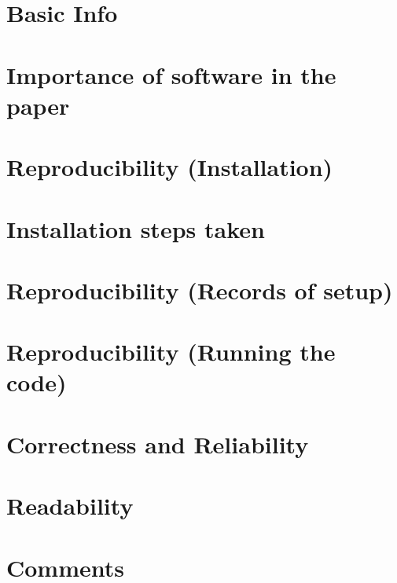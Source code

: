 \documentclass[10pt]{article}
\begin{document}
\section{Basic Info}


\section{Importance of software in the paper}


\section{Reproducibility (Installation)}


\section{Installation steps taken}


\section{Reproducibility (Records of setup)}


\section{Reproducibility (Running the code)}


\section{Correctness and Reliability}


\section{Readability}

 
\section{Comments}

\end{document}
